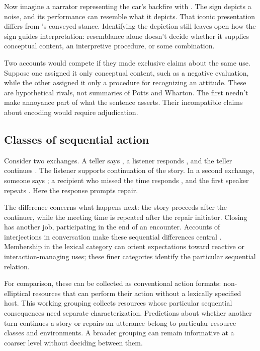 \documentclass[12pt]{article}
\begin{document}
Now imagine a narrator representing the car's backfire with .
The sign depicts a noise, and its performance can resemble what it
depicts. That iconic presentation differs from 's conveyed
stance. Identifying the depiction still leaves open how the sign guides
interpretation: resemblance alone doesn't decide whether it supplies
conceptual content, an interpretive procedure, or some combination.

Two accounts would compete if they made exclusive claims
about the same  use. Suppose one assigned it only
conceptual content, such as a negative evaluation, while the other
assigned it only a procedure for recognizing an attitude. These are
hypothetical rivals, not summaries of Potts and Wharton. The first
needn't make annoyance part of what the sentence asserts. Their
incompatible claims about encoding would require adjudication.

\subsection{Classes of sequential action}

Consider two exchanges. A teller says , a listener responds , and the teller continues
. The listener supports continuation of the
story. In a second exchange, someone says ;
a recipient who missed the time responds , and the first
speaker repeats . Here the response prompts repair.

The difference concerns what happens next: the story proceeds after
the continuer, while the meeting time is repeated after the repair
initiator. Closing  has another job, participating in the
end of an encounter. Accounts of interjections in conversation make
these sequential differences central \citep[257--259, 263--265]{dingemanse2024}.
Membership in the lexical category can orient expectations toward reactive
or interaction-managing uses; these finer categories identify the particular
sequential relation.

For comparison, these can be collected as conventional action formats:
non-elliptical resources that can perform their action without a lexically
specified host. This working grouping collects resources whose particular sequential
consequences need separate characterization. Predictions about whether
another turn continues a story or repairs an utterance belong to
particular resource classes and environments. A broader grouping can
remain informative at a coarser level without deciding between them.
\end{document}
